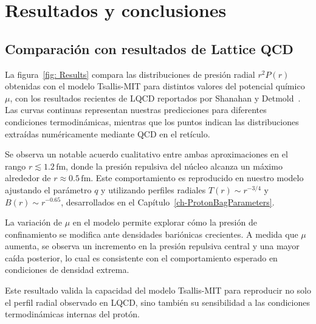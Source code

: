 \chapter{Resultados y conclusiones}

\pagestyle{fancy}
\fancyhf{}
\fancyhead[LE]{\nouppercase{\textbf{\leftmark}\hfill\textit{\rightmark}}}
\fancyhead[RO]{\nouppercase{\textit{\rightmark}\hfill\textbf{\leftmark}}}



\section{Comparación con resultados de Lattice QCD}

La figura~\ref{fig: Results} compara las distribuciones de presión radial \( r^2 P(r) \) obtenidas con el modelo Tsallis-MIT para distintos valores del potencial químico \( \mu \), con los resultados recientes de LQCD reportados por Shanahan y Detmold~\cite{Shanahan2019}. Las curvas continuas representan nuestras predicciones para diferentes condiciones termodinámicas, mientras que los puntos indican las distribuciones extraídas numéricamente mediante QCD en el retículo.

Se observa un notable acuerdo cualitativo entre ambas aproximaciones en el rango \( r \lesssim 1.2\,\text{fm} \), donde la presión repulsiva del núcleo alcanza un máximo alrededor de \( r \approx 0.5\,\text{fm} \). Este comportamiento es reproducido en nuestro modelo ajustando el parámetro \( q \) y utilizando perfiles radiales \( T(r) \sim r^{-3/4} \) y \( B(r) \sim r^{-0.65} \), desarrollados en el Capítulo~\ref{ch-ProtonBagParameters}.

\begin{remark}
    La variación de \( \mu \) en el modelo permite explorar cómo la presión de confinamiento se modifica ante densidades bariónicas crecientes. A medida que \( \mu \) aumenta, se observa un incremento en la presión repulsiva central y una mayor caída posterior, lo cual es consistente con el comportamiento esperado en condiciones de densidad extrema.
\end{remark}

Este resultado valida la capacidad del modelo Tsallis-MIT para reproducir no solo el perfil radial observado en LQCD, sino también su sensibilidad a las condiciones termodinámicas internas del protón.

